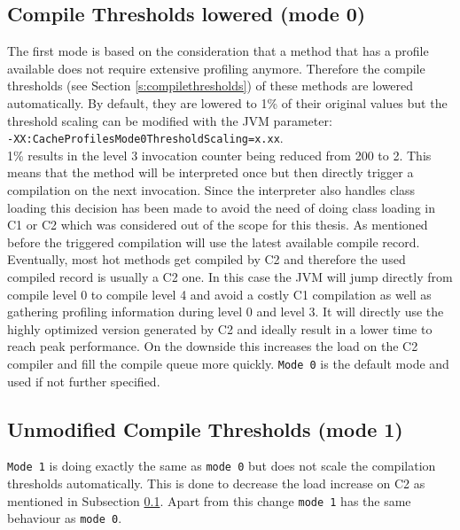 \subsection{Compile Thresholds lowered (mode 0)}
\label{s:mode0}
The first mode is based on the consideration that a method that has a profile available does not require extensive profiling anymore. Therefore the compile thresholds (see Section \ref{s:compilethresholds}) of these methods are lowered automatically. By default, they are lowered to 1\% of their original values but the threshold scaling can be modified with the JVM parameter: \\\texttt{-XX:CacheProfilesMode0ThresholdScaling=x.xx}. 
\\1\% results in the level 3 invocation counter being reduced from 200 to 2. This means that the method will be interpreted once but then directly trigger a compilation on the next invocation.
Since the interpreter also handles class loading this decision has been made to avoid the need of doing class loading in C1 or C2 which was considered out of the scope for this thesis.
As mentioned before the triggered compilation will use the latest available compile record. Eventually, most hot methods get compiled by C2 and therefore the used compiled record is usually a C2 one. In this case the JVM will jump directly from compile level 0 to compile level 4 and avoid a costly C1 compilation as well as gathering profiling information during level 0 and level 3.
It will directly use the highly optimized version generated by C2 and ideally result in a lower time to reach peak performance.
On the downside this increases the load on the C2 compiler and fill the compile queue more quickly.
\texttt{Mode 0} is the default mode and used if not further specified.
\subsection{Unmodified Compile Thresholds (mode 1)}
\label{s:mode1}
\texttt{Mode 1} is doing exactly the same as \texttt{mode 0} but does not scale the compilation thresholds automatically.
This is done to decrease the load increase on C2 as mentioned in Subsection \ref{s:mode0}.
Apart from this change \texttt{mode 1} has the same behaviour as \texttt{mode 0}.
